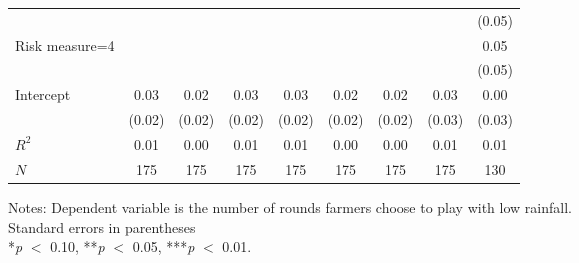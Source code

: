 \begin{table}[htbp]
\begin{threeparttable}
\begin{tabular}{l cccccccc}
                    &               &               &               &               &               &               &               &      (0.05)   \\
Risk measure=4      &               &               &               &               &               &               &               &        0.05   \\
                    &               &               &               &               &               &               &               &      (0.05)   \\
Intercept           &        0.03   &        0.02   &        0.03   &        0.03   &        0.02   &        0.02   &        0.03   &        0.00   \\
                    &      (0.02)   &      (0.02)   &      (0.02)   &      (0.02)   &      (0.02)   &      (0.02)   &      (0.03)   &      (0.03)   \\
\hline
$R^2$               &        0.01   &        0.00   &        0.01   &        0.01   &        0.00   &        0.00   &        0.01   &        0.01   \\
$N$                 &         175   &         175   &         175   &         175   &         175   &         175   &         175   &         130   \\
\hline
\hline
\end{tabular}
\begin{tablenotes}
\footnotesize
\item{Notes: Dependent variable is the number of rounds farmers choose to play with low rainfall. \\ Standard errors in parentheses \\ *\textit{p} $<$ 0.10, **\textit{p} $<$ 0.05, ***\textit{p} $<$ 0.01.}
\end{tablenotes}
\end{threeparttable}
\end{table}

